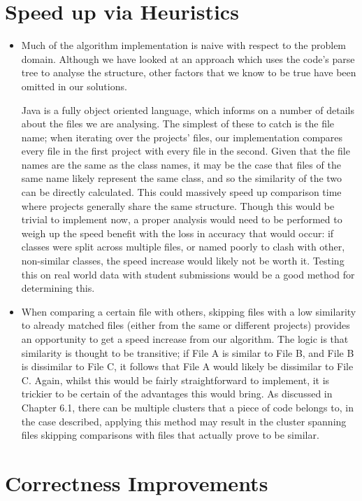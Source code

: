 \section{Speed up via Heuristics}
\begin{itemize}
\item
Much of the algorithm implementation is naive with respect to the problem domain.
Although we have looked at an approach which uses the code's parse tree to 
analyse the structure, other factors that we know to be true have been omitted
in our solutions. 

Java is a fully object oriented language, which informs on a number of details
about the files we are analysing. The simplest of these to catch is the file name;
when iterating over the projects' files, our implementation compares every file
in the first project with every file in the second. Given that the file names
are the same as the class names, it may be the case that files of the same name
likely represent the same class, and so the similarity of the two can be directly
calculated. This could massively speed up comparison time where projects generally
share the same structure. Though this would be trivial to implement now, a proper
analysis would need to be performed to weigh up the speed benefit with the loss in
accuracy that would occur: if classes were split across multiple files, or named
poorly to clash with other, non-similar classes, the speed increase would likely not
be worth it. Testing this on real world data with student submissions would be
a good method for determining this.

\item
When comparing a certain file with others, skipping files with a low similarity 
to already matched files (either from the same or different projects) provides
an opportunity to get a speed increase from our algorithm. The logic is that
similarity is thought to be transitive; if File A is similar to File B, and
File B is dissimilar to File C, it follows that File A would likely be dissimilar
to File C. Again, whilst this would be fairly straightforward to implement, it
is trickier to be certain of the advantages this would bring. As discussed in
Chapter 6.1, there can be multiple clusters that a piece of code belongs
to, in the case described, applying this method may result in the cluster
spanning files skipping comparisons with files that actually prove to be similar.
\end{itemize}

\section{Correctness Improvements}


